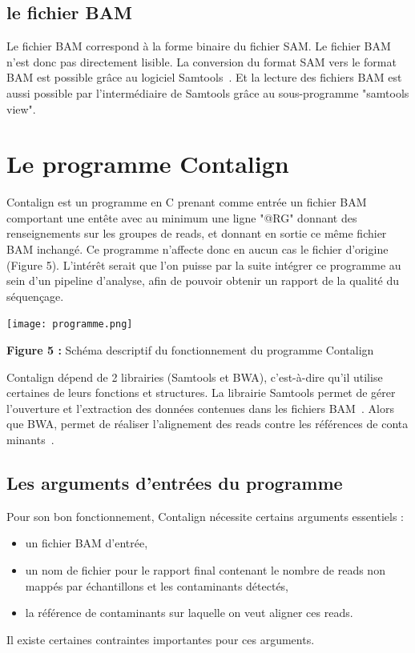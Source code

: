 \documentclass[a4paper,12pt]{article}
\begin{document}
\subsection{le fichier BAM}
Le fichier BAM correspond à la forme binaire du fichier SAM. Le fichier BAM n'est donc pas directement lisible. La conversion du format SAM vers le format BAM est possible grâce au logiciel Samtools~\cite{SAM2}. Et la lecture des fichiers BAM est aussi possible par l'intermédiaire de Samtools grâce au sous-programme "samtools view". 
 \\
\section{Le programme Contalign}
Contalign est un programme en C prenant comme entrée un fichier BAM comportant une entête avec au minimum une ligne "@RG" donnant des renseignements sur les groupes de reads, et donnant en sortie ce même fichier BAM inchangé. Ce programme n'affecte donc en aucun cas le fichier d'origine (Figure 5). L'intérêt serait que l'on puisse par la suite intégrer ce programme au sein d'un pipeline d'analyse, afin de pouvoir obtenir un rapport de la qualité du séquençage. 
 
\begin{center}
\texttt{[image: programme.png]}~
\end{center}
\begin{center}
\textbf{ Figure 5 : }Schéma descriptif du fonctionnement du programme Contalign
\end{center}
Contalign dépend de 2 librairies (Samtools et BWA), c'est-à-dire qu'il utilise certaines de leurs fonctions et structures. La librairie Samtools permet de gérer l'ouverture et l'extraction des données contenues dans les fichiers BAM~\cite{SAM2}. Alors que BWA, permet de réaliser l'alignement des reads contre les références de conta minants~\cite{BWA}. 
\\
\subsection{Les arguments d'entrées du programme}

Pour son bon fonctionnement, Contalign nécessite certains arguments essentiels : 
\begin{itemize}
\item un fichier BAM d'entrée, 
\item un nom de fichier pour le rapport final contenant le nombre de reads non mappés par échantillons et les contaminants détectés, 
\item la référence de contaminants sur laquelle on veut aligner ces reads.
\end{itemize}
Il existe certaines contraintes importantes pour ces arguments. \\
\end{document}
